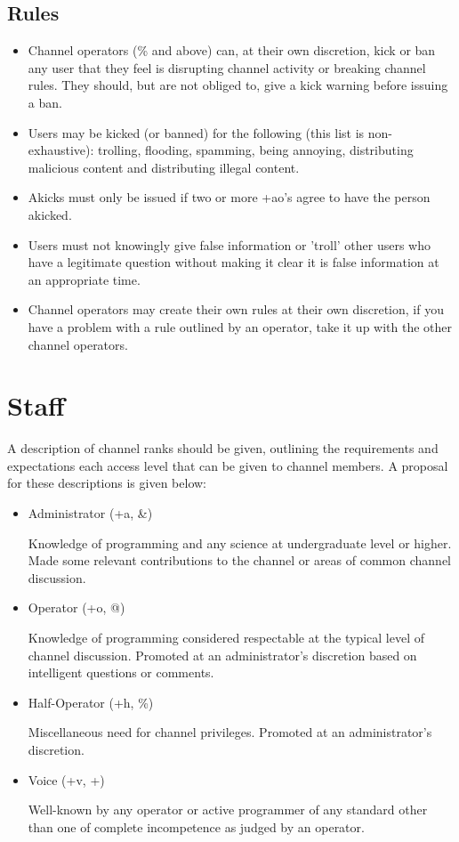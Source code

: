 \documentclass[11pt,a4paper,notitlepage]{article}
\begin{document}
\subsection{Rules}
\begin{itemize}
\item Channel operators (\% and above) can, at their own discretion, kick or ban any user that they feel is disrupting channel activity or breaking channel rules.
They should, but are not obliged to, give a kick warning before issuing a ban.
\item Users may be kicked (or banned) for the following (this list is non-exhaustive): trolling, flooding, spamming, being annoying, distributing malicious content and distributing illegal content. 
\item Akicks must only be issued if two or more +ao's agree to have the person akicked. 
\item Users must not knowingly give false information or 'troll' other users who have a legitimate question without making it clear it is false information at an appropriate time.
\item Channel operators may create their own rules at their own discretion, if you have a problem with a rule outlined by an operator, take it up with the other channel operators.
\end{itemize}

\section{Staff}
A description of channel ranks should be given, outlining the requirements and expectations
each access level that can be given to channel members. A proposal for these descriptions is given below:

\begin{itemize}
\item Administrator (+a, \&)

Knowledge of programming and any science at undergraduate level or higher. Made some relevant contributions to the channel or areas of common channel discussion.
\item Operator (+o, @)

Knowledge of programming considered respectable at the typical level of channel
discussion. Promoted at an administrator's discretion based on intelligent questions
or comments.
\item Half-Operator (+h, \%)

 Miscellaneous need for channel privileges. Promoted at an administrator's discretion.
\item Voice (+v, +)

 Well-known by any operator or active programmer of any standard other than one of
 complete incompetence as judged by an operator.
\end{itemize}
\end{document}

